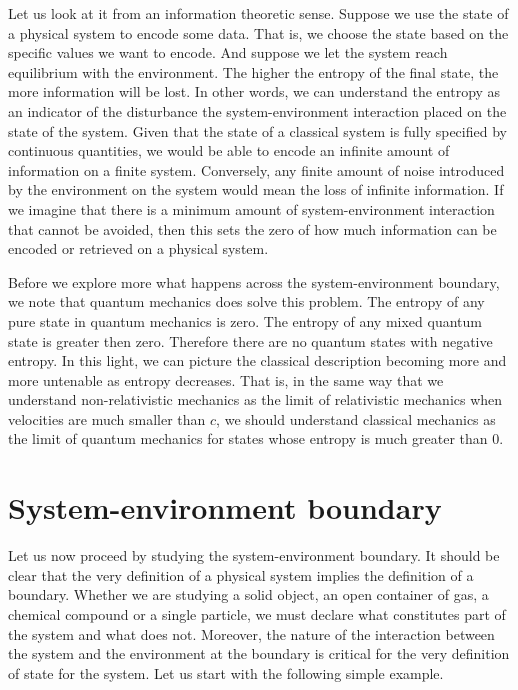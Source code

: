 \documentclass[10pt,twocolumn, nofootinbib]{revtex4-2}
\begin{document}
Let us look at it from an information theoretic sense. Suppose we use the state of a physical system to encode some data. That is, we choose the state based on the specific values we want to encode. And suppose we let the system reach equilibrium with the environment. The higher the entropy of the final state, the more information will be lost. In other words, we can understand the entropy as an indicator of the disturbance the system-environment interaction placed on the state of the system. Given that the state of a classical system is fully specified by continuous quantities, we would be able to encode an infinite amount of information on a finite system. Conversely, any finite amount of noise introduced by the environment on the system would mean the loss of infinite information. If we imagine that there is a minimum amount of system-environment interaction that cannot be avoided, then this sets the zero of how much information can be encoded or retrieved on a physical system.

Before we explore more what happens across the system-environment boundary, we note that quantum mechanics does solve this problem. The entropy of any pure state in quantum mechanics is zero. The entropy of any mixed quantum state is greater then zero. Therefore there are no quantum states with negative entropy. In this light, we can picture the classical description becoming more and more untenable as entropy decreases. That is, in the same way that we understand non-relativistic mechanics as the limit of relativistic mechanics when velocities are much smaller than $c$, we should understand classical mechanics as the limit of quantum mechanics for states whose entropy is much greater than $0$.

\section{System-environment boundary}

Let us now proceed by studying the system-environment boundary. It should be clear that the very definition of a physical system implies the definition of a boundary. Whether we are studying a solid object, an open container of gas, a chemical compound or a single particle, we must declare what constitutes part of the system and what does not. Moreover, the nature of the interaction between the system and the environment at the boundary is critical for the very definition of state for the system. Let us start with the following simple example.
\end{document}
